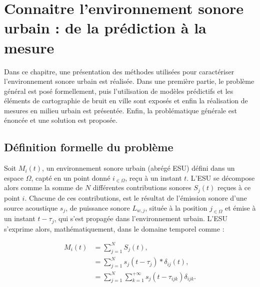
\chapter{Connaitre l'environnement sonore urbain : de la prédiction à la mesure}\label{chap:modele}
\thispagestyle{empty}

Dans ce chapitre, une présentation des méthodes utilisées pour caractériser l'environnement sonore urbain est réalisée. Dans une première partie, le problème général est posé formellement, puis l'utilisation de modèles prédictifs et les éléments de cartographie de bruit en ville sont exposés et enfin la réalisation de mesures en milieu urbain est présentée. Enfin, la problématique générale est énoncée et une solution est proposée.

\section{Définition formelle du problème}

Soit $M_{i}(t)$, un environnement sonore urbain (abrégé ESU) défini dans un espace $\Omega$, capté en un point donné $i_{\in \Omega}$, reçu à un instant $t$. L'ESU se décompose alors comme la somme de $N$ différentes contributions sonores $S_j(t)$ reçues à ce point $i$. Chacune de ces contributions, est le résultat de l'émission sonore d'une source acoustique $s_j$, de puissance sonore $L_{w,j}$, située à la position $j_{\in \Omega}$ et émise à un instant $t-\tau_j$,  qui s'est propagée dans l'environnement urbain. L'ESU s'exprime alors, mathématiquement, dans le domaine temporel comme :

\begin{subequations}\label{eq:esu_formel}
\begin{align}
M_i(t) &= \sum_{j = 1}^{N}S_j(t), \\
 & = \sum_{j = 1}^{N} s_j(t-\tau_j) \ast \delta_{ij}(t), \label{eq:convolution_ESU}\\
 & = \sum_{j = 1}^{N} \sum_{k = 1}^{+\infty} s_j(t-\tau_{ijk}) \delta_{ijk}.\label{eq:propagation}
\end{align}
\end{subequations}


